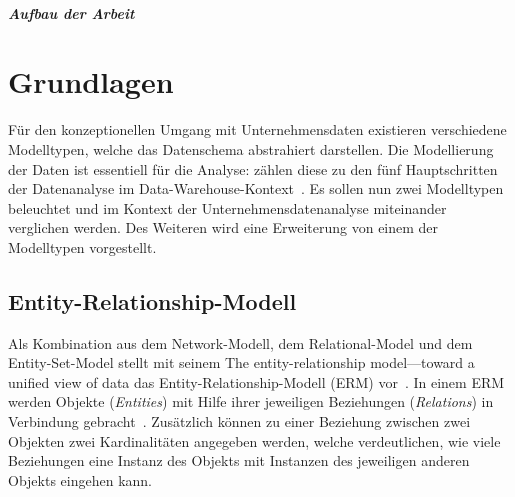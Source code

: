 \documentclass[
  language=german, %
  type=bachelor%
]{isthesis}
\begin{document}
\begin{content}
  \paragraph{Aufbau der Arbeit}




  \chapter{Grundlagen}


  Für den konzeptionellen Umgang mit Unternehmensdaten existieren verschiedene
  Modelltypen, welche das Datenschema abstrahiert darstellen.
  Die Modellierung der Daten ist essentiell für die Analyse:
  \textsc{\citeauthor{phipps2002automating}} zählen diese
  zu den fünf Hauptschritten der Datenanalyse im
  Data-Warehouse-Kontext~\cite[][S. 1]{phipps2002automating}. Es sollen nun
  zwei Modelltypen beleuchtet und im Kontext der Unternehmensdatenanalyse
  miteinander verglichen werden. Des Weiteren wird eine Erweiterung von einem
  der Modelltypen vorgestellt.

  \section{Entity-Relationship-Modell}
  Als Kombination aus dem
  Network-Modell, dem Relational-Model und dem Entity-Set-Model stellt
  \citeauthor{chen1976entity} \citeyear{chen1976entity} mit seinem
    \glqq{}The entity-relationship
  model—toward a unified view of data\grqq{} das Entity-Relationship-Modell
  (ERM) vor~\cite[][S. 2]{chen1976entity}. In einem \acrshort{ERM} werden Objekte
  (\textit{Entities}) mit Hilfe ihrer jeweiligen Beziehungen
  (\textit{Relations}) in Verbindung gebracht~\cite[][S. 10]{chen1976entity}.
  Zusätzlich können zu einer Beziehung zwischen zwei Objekten zwei Kardinalitäten
  angegeben werden, welche verdeutlichen, wie viele Beziehungen eine Instanz des
  Objekts mit Instanzen des jeweiligen anderen Objekts eingehen kann\cite[][S.
  38]{ballard1998data}.

  \begin{figure}[caption={Beispiel eines \acrlong{ERM}}, label={fig:img01}]
  \end{figure}


\end{content}
\end{document}
